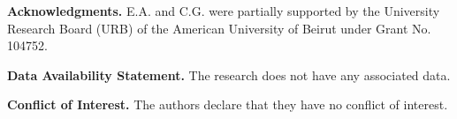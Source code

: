 \documentclass[11pt,reqno]{amsart}
\begin{document}
\vspace{0.5cm}

{\bf{Acknowledgments.}} E.A. and C.G. were partially supported by the University Research Board (URB) of the American University of Beirut under Grant No. 104752. 

\vspace{0.5cm}

{\bf{Data Availability Statement.}} The research does not have any associated data.

\vspace{0.5cm}

{\bf{Conflict of Interest.}} The authors declare that they have no conflict of interest.





\end{document}
